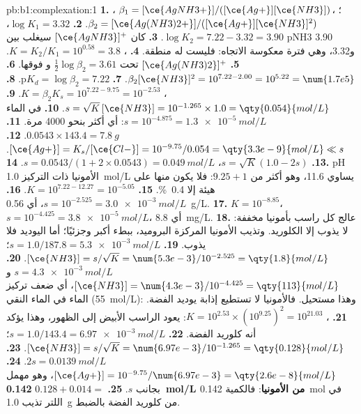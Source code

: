 \begin{solution}{pb:b1:complexation:1}
\textbf{1.} ، $\beta_1 = [\ce{AgNH3+}]/([\ce{Ag+}][\ce{NH3}])$؛
، $\beta_2 = [\ce{Ag(NH3)2+}]/([\ce{Ag+}][\ce{NH3}]^2)$.
\textbf{2.} $\log K_1 = 3.32$، $\log K_2 = 7.22 - 3.32 = 3.90$.
\textbf{3.} كان $[\ce{AgNH3}]^{+}$ سيغلب بين pNH3 3.90 و3.32،
وهي فترة معكوسة الاتجاه: فليست له منطقة.
\textbf{4.} ، $K = K_2/K_1 = 10^{0.58} =
3.8$.
\textbf{5.} $[\ce{Ag(NH3)2}]^{+}$ تحت $\frac12\log\beta_2 = 3.61$ و
فوقها.
\textbf{6.} $\beta_2[\ce{NH3}]^2 = 10^{7.22 - 2.00} = 10^{5.22} = \num{1.7e5}$.
\textbf{7.} $\mathrm{p}K_d = \log\beta_2 = 7.22$.
\textbf{8.} ، $K = \beta_2K_s =
10^{7.22 - 9.75} = 10^{-2.53}$.
\textbf{9.} $s = \sqrt{K}\,[\ce{NH3}] = 10^{-1.265} \times 1.0 =
\qty{0.054}{mol/L}$.
\textbf{10.} في الماء $s = 10^{-4.875} = \qty{1.3e-5}{mol/L}$: أي أكثر بنحو 4000
مرة.
\textbf{11.} $0.0543 \times 143.4 = \qty{7.8}{g}$.
\textbf{12.} $[\ce{Ag+}] = K_s/[\ce{Cl-}] = 10^{-9.75}/0.054 =
\qty{3.3e-9}{mol/L} \ll s$.
\textbf{13.} $s = \sqrt{K}(1.0 - 2s)$، $s = 0.0543/(1 + 2 \times 0.0543) =
\qty{0.049}{mol/L}$.
\textbf{14.} pH الأمونيا ذات التركيز \qty{1.0}{mol/L} يساوي 11.6، وهو أكثر من $9.25 + 1$:
فلا يكون منها على هيئة  إلا \qty{0.4}{\percent}.
\textbf{15.} $K = 10^{7.22 - 12.27} = 10^{-5.05}$.
\textbf{16.} $s = 10^{-2.525} = \qty{3.0e-3}{mol/L}$، أي \qty{0.56}{g/L}.
\textbf{17.} $K = 10^{-8.85}$، $s = 10^{-4.425} = \qty{3.8e-5}{mol/L}$،
أي \qty{8.8}{mg/L}.
\textbf{18.} عالج كل راسب بأمونيا مخففة: لا يذوب إلا الكلوريد. وتذيب
الأمونيا المركزة البروميد، ببطء أكبر وجزئيًا؛ أما اليوديد فلا يذوب.
\textbf{19.} $s = 1.0/187.8 = \qty{5.3e-3}{mol/L}$؛ $[\ce{NH3}] = s/\sqrt{K}
= \num{5.3e-3}/10^{-2.525} = \qty{1.8}{mol/L}$.
\textbf{20.} $s = \qty{4.3e-3}{mol/L}$ و$[\ce{NH3}] = \num{4.3e-3}/10^{-4.425}
= \qty{113}{mol/L}$، أي ضعف تركيز الماء في الماء النقي
(\qty{55}{mol/L}): وهذا مستحيل. فالأمونيا لا تستطيع إذابة يوديد الفضة.
\textbf{21.} ،
$K = 10^{2.53} \times (10^{9.25})^2 = 10^{21.03}$: يعود الراسب الأبيض
إلى الظهور، وهذا يؤكد أنه كلوريد الفضة.
\textbf{22.} $s = 1.0/143.4 = \qty{6.97e-3}{mol/L}$؛ $[\ce{NH3}] =
s/\sqrt{K} = \num{6.97e-3}/10^{-1.265} = \qty{0.128}{mol/L}$.
\textbf{23.} $2s = \qty{0.0139}{mol/L}$.
\textbf{24.} $[\ce{Ag+}] = 10^{-9.75}/\num{6.97e-3} = \qty{2.6e-8}{mol/L}$،
وهو مهمل بجانب $s$.
\textbf{25.} $0.128 + 0.014 = $ \textbf{\qty{0.142}{mol/L} من الأمونيا}:
فالكمية \qty{0.142}{mol} في اللتر تذيب \qty{1.0}{g} من كلوريد
الفضة بالضبط.
\end{solution}
